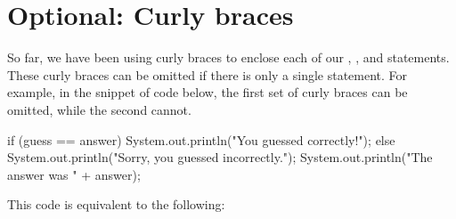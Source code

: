 





\section{Optional: Curly braces}
So far, we have been using curly braces to enclose each of our , , and  statements. These curly braces can be omitted if there is only a single statement. For example, in the snippet of code below, the first set of curly braces can be omitted, while the second cannot.

\begin{code}
if (guess == answer) 
{
    System.out.println("You guessed correctly!");
} 
else 
{
    System.out.println("Sorry, you guessed incorrectly.");
    System.out.println("The answer was " + answer);
} 
\end{code}

This code is equivalent to the following:

